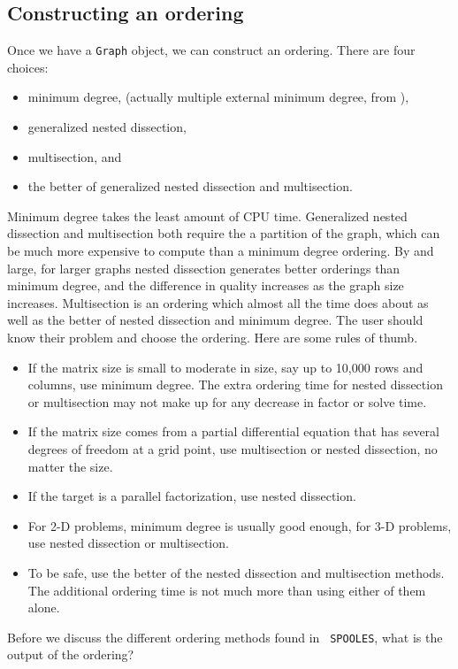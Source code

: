 \subsection{Constructing an ordering}
\label{subsection:order}
\par
Once we have a {\tt Graph} object, we can construct an ordering.
There are four choices:
\begin{itemize}
\item
minimum degree, (actually multiple external minimum degree,
from \cite{liu85-mmd}),
\item
generalized nested dissection,
\item
multisection, and
\item
the better of generalized nested dissection and multisection.
\end{itemize}
Minimum degree takes the least amount of CPU time.
Generalized nested dissection and multisection both require the
a partition of the graph, which can be much more expensive to compute 
than a minimum degree ordering.
By and large, for larger graphs nested dissection generates 
better orderings than minimum degree, and the difference in quality
increases as the graph size increases.
Multisection is an ordering which almost all the time does about as
well as the better of nested dissection and minimum degree.
The user should know their problem and choose the ordering.
Here are some rules of thumb.
\begin{itemize}
\item
If the matrix size is small to moderate in size, say up to 10,000
rows and columns, use minimum degree.
The extra ordering time for nested dissection or multisection may
not make up for any decrease in factor or solve time.
\item
If the matrix size comes from a partial differential equation that
has several degrees of freedom at a grid point, use multisection or
nested dissection, no matter the size.
\item
If the target is a parallel factorization, use nested dissection.
\item
For 2-D problems, minimum degree is usually good enough, for 3-D
problems, use nested dissection or multisection.
\item
To be safe, use the better of the nested dissection and
multisection methods.
The additional ordering time is not much more than using either of
them alone.
\end{itemize}
Before we discuss the different ordering methods found in {\tt
SPOOLES}, what is the output of the ordering?
